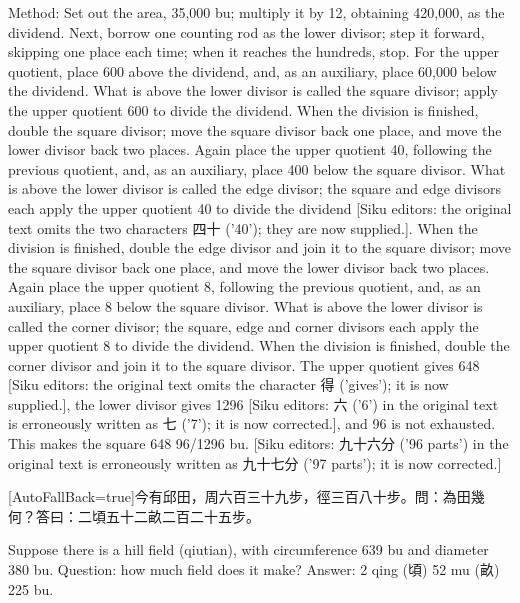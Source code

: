 \documentclass[11pt]{article}
\newcommand{\unitlabel}[1]{\marginpar{\raggedleft\tiny\color{gray}#1}}
\newenvironment{unitzh}{\par\CJKfontspec{Noto Serif CJK SC}[AutoFallBack=true]\large\linespread{1.25}\selectfont}{\par}
\newenvironment{uniten}{\par\small\color{black!85}}{\par\medskip}
\begin{document}
\begin{uniten}Method: Set out the area, 35,000 bu; multiply it by 12, obtaining 420,000, as the dividend. Next, borrow one counting rod as the lower divisor; step it forward, skipping one place each time; when it reaches the hundreds, stop. For the upper quotient, place 600 above the dividend, and, as an auxiliary, place 60,000 below the dividend. What is above the lower divisor is called the square divisor; apply the upper quotient 600 to divide the dividend. When the division is finished, double the square divisor; move the square divisor back one place, and move the lower divisor back two places. Again place the upper quotient 40, following the previous quotient, and, as an auxiliary, place 400 below the square divisor. What is above the lower divisor is called the edge divisor; the square and edge divisors each apply the upper quotient 40 to divide the dividend [Siku editors: the original text omits the two characters 四十 ('40'); they are now supplied.]. When the division is finished, double the edge divisor and join it to the square divisor; move the square divisor back one place, and move the lower divisor back two places. Again place the upper quotient 8, following the previous quotient, and, as an auxiliary, place 8 below the square divisor. What is above the lower divisor is called the corner divisor; the square, edge and corner divisors each apply the upper quotient 8 to divide the dividend. When the division is finished, double the corner divisor and join it to the square divisor. The upper quotient gives 648 [Siku editors: the original text omits the character 得 ('gives'); it is now supplied.], the lower divisor gives 1296 [Siku editors: 六 ('6') in the original text is erroneously written as 七 ('7'); it is now corrected.], and 96 is not exhausted. This makes the square 648 96/1296 bu. [Siku editors: 九十六分 ('96 parts') in the original text is erroneously written as 九十七分 ('97 parts'); it is now corrected.]\end{uniten}

\begin{unitzh}\unitlabel{sunzi-004.7}今有邱田，周六百三十九步，徑三百八十步。問：為田幾何？答曰：二頃五十二畝二百二十五步。\end{unitzh}
\begin{uniten}Suppose there is a hill field (qiutian), with circumference 639 bu and diameter 380 bu. Question: how much field does it make? Answer: 2 qing (頃) 52 mu (畝) 225 bu.\end{uniten}
\end{document}
